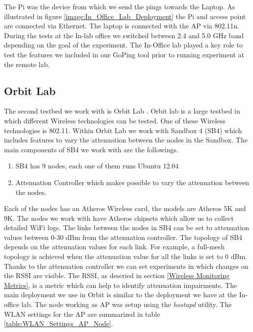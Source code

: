 The Pi was the device from which we send the pings towards the Laptop. As illustrated in figure \ref{image:In_Office_Lab_Deployment} the Pi and access point are connected via Ethernet. The laptop is connected with the AP via 802.11n. During the tests at the In-lab office we switched between 2.4 and 5.0 GHz band depending on the goal of the experiment. The In-Office lab played a key role to test the features we included in our GoPing tool prior to running experiment at the remote lab.

\subsection*{Orbit Lab}

The second testbed we work with is Orbit Lab \cite{orbit2005}. Orbit lab is a large testbed in which different Wireless technologies can be tested. One of these Wireless technologies is 802.11. Within Orbit Lab we work with Sandbox 4 (SB4) which includes features to vary the attenuation between the nodes in the Sandbox. The main components of SB4 we work with are the followings.

\begin{enumerate}
	\item SB4 has 9 nodes, each one of them runs Ubuntu 12.04
	\item Attenuation Controller which makes possible to vary the attenuation between the nodes.
\end{enumerate}

Each of the nodes has an Atheros Wireless card, the models are Atheros 5K and 9K. The nodes we work with have Atheros chipsets which allow us to collect detailed WiFi logs. The links between the nodes in SB4 can be set to attenuation values between 0-30 dBm from the attenuation controller. The topology of SB4 depends on the attenuation values for each link. For example, a full-mesh topology is achieved when the attenuation value for all the links is set to 0 dBm. Thanks to the attenuation controller we can set experiments in which changes on the RSSI are visible. The RSSI, as descried in section \ref{Wireless Monitoring Metrics}, is a metric which can help to identify attenuation impairments. The main deployment we use in  Orbit is similar to the deployment we have at the In-office lab. The node working as AP was setup using the \emph{hostapd} utility. The WLAN settings for the AP are summarized in table \ref{table:WLAN_Settings_AP_Node}.

